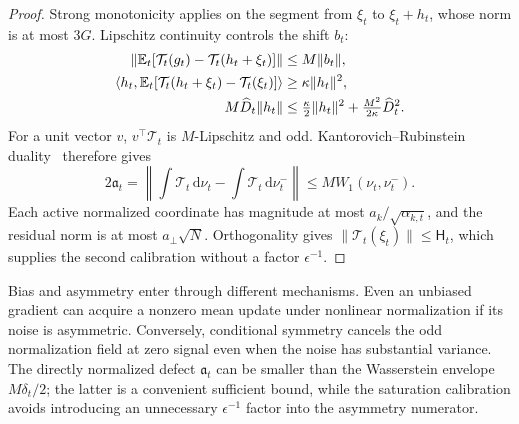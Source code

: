 \begin{proof}
Strong monotonicity applies on the segment from $\xi_t$ to $\xi_t+h_t$,
whose norm is at most $3G$. Lipschitz continuity controls the shift $b_t$:
\begin{align}
 \|\mathbb E_t[\mathcal T_t(g_t)-\mathcal T_t(h_t+\xi_t)]\|
 &\le M\|b_t\|,\\
 \langle h_t,\mathbb E_t[\mathcal T_t(h_t+\xi_t)-\mathcal T_t(\xi_t)]\rangle
 &\ge\kappa\|h_t\|^2,\\
 M\widehat D_t\|h_t\|&\le\tfrac\kappa2\|h_t\|^2
                              +\tfrac{M^2}{2\kappa}\widehat D_t^2.
\end{align}
For a unit vector $v$, $v^\top\mathcal T_t$ is $M$-Lipschitz and odd.
Kantorovich--Rubinstein duality~\citep{villani2009optimal} therefore gives
\begin{equation}
 2\mathfrak a_t
 =\left\|\int\mathcal T_t\,\mathrm d\nu_t-
                  \int\mathcal T_t\,\mathrm d\nu_t^-\right\|
 \le M W_1(\nu_t,\nu_t^-).
\end{equation}
Each active normalized coordinate has magnitude at most
$a_k/\sqrt{\alpha_{k,t}}$, and the residual norm is at most
$a_\perp\sqrt N$. Orthogonality gives $\|\mathcal T_t(\xi_t)\|\le\mathsf H_t$,
which supplies the second calibration without a factor $\epsilon^{-1}$.
\end{proof}
Bias and asymmetry enter through different mechanisms. Even an unbiased
gradient can acquire a nonzero mean update under nonlinear normalization if
its noise is asymmetric. Conversely, conditional symmetry cancels the odd
normalization field at zero signal even when the noise has substantial
variance. The directly normalized defect $\mathfrak a_t$ can be smaller than
the Wasserstein envelope $M\delta_t/2$; the latter is a convenient sufficient
bound, while the saturation calibration avoids introducing an unnecessary
$\epsilon^{-1}$ factor into the asymmetry numerator.

